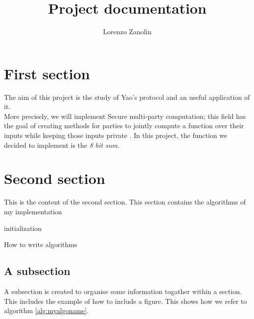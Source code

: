 \documentclass[12pt]{article}
\title{Project documentation}
\author{Lorenzo Zanolin}
\begin{document}
\maketitle

\section{First section}
The aim of this project is the study of Yao's protocol \cite{yao} and an useful application of it.\\ More precisely, we will implement Secure multi-party computation; this field has the goal of creating methods for parties to jointly compute a function over their inputs while keeping those inputs private \cite{mpc}. In this project, the function we decided to implement is the \textit{8 bit sum}.


\section{Second section}

This is the content of the second section. This section contains the algorithms of my implementation


\begin{algorithm}[H]
\SetAlgoLined
{}
 initialization\;
 \caption{How to write algorithms}\label{alg:myalgoname}
\end{algorithm}



\subsection{A subsection}
A subsection is created to organise some information togather within a section. This includes the example of how to include
a figure. This shows how we refer to algorithm \ref{alg:myalgoname}.


 
\end{document}
